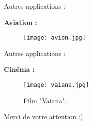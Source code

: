 \documentclass[11pt]{beamer}
\begin{document}

\begin{frame}{Autres applications :}

\textbf{Aviation :}
\begin{center}
\begin{figure}
\texttt{[image: avion.jpg]}
\end{figure}
\end{center}

\end{frame}


\begin{frame}{Autres applications :}

\textbf{Cinéma :}
\begin{center}
\begin{figure}
\texttt{[image: vaiana.jpg]}
\caption{Film "Vaiana".}
\end{figure}
\end{center}

\end{frame}


\begin{frame}
\begin{center}
Merci de votre attention :)
\end{center}
\end{frame}
\end{document}
